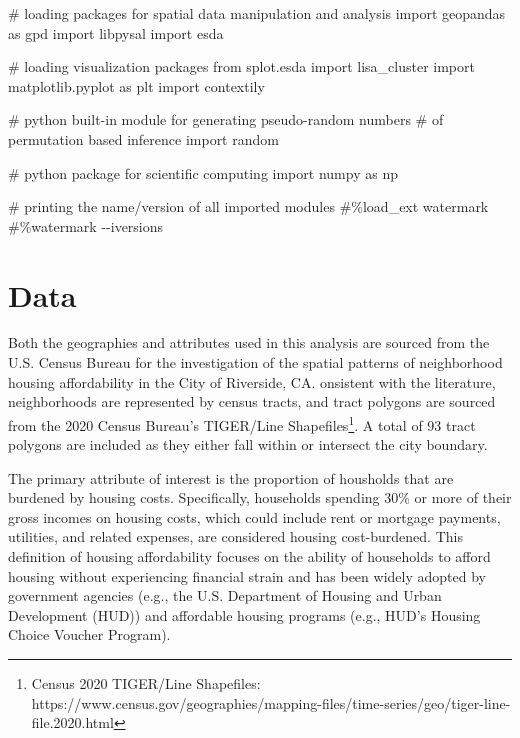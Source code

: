 \documentclass[
]{aft}
\newenvironment{Shaded}{\begin{snugshade}}{\end{snugshade}}
\newcommand{\CommentTok}[1]{\textcolor[rgb]{0.37,0.37,0.37}{#1}}
\newcommand{\ImportTok}[1]{\textcolor[rgb]{0.00,0.46,0.62}{#1}}
\newcommand{\NormalTok}[1]{\textcolor[rgb]{0.00,0.23,0.31}{#1}}
\begin{document}
\begin{Shaded}
\begin{Highlighting}[]
\CommentTok{\# loading packages for spatial data manipulation and analysis }
\ImportTok{import}\NormalTok{ geopandas }\ImportTok{as}\NormalTok{ gpd}
\ImportTok{import}\NormalTok{ libpysal}
\ImportTok{import}\NormalTok{ esda}

\CommentTok{\# loading visualization packages}
\ImportTok{from}\NormalTok{ splot.esda }\ImportTok{import}\NormalTok{ lisa\_cluster}
\ImportTok{import}\NormalTok{ matplotlib.pyplot }\ImportTok{as}\NormalTok{ plt}
\ImportTok{import}\NormalTok{ contextily}

\CommentTok{\# python built{-}in module for generating pseudo{-}random numbers }
\CommentTok{\# of permutation based inference}
\ImportTok{import}\NormalTok{ random}

\CommentTok{\# python package for scientific computing }
\ImportTok{import}\NormalTok{ numpy }\ImportTok{as}\NormalTok{ np}

\CommentTok{\# printing the name/version of all imported modules}
\CommentTok{\#\%load\_ext watermark}
\CommentTok{\#\%watermark {-}{-}iversions }
\end{Highlighting}
\end{Shaded}

\section{Data}\label{sec-data}

Both the geographies and attributes used in this analysis are sourced
from the U.S. Census Bureau for the investigation of the spatial
patterns of neighborhood housing affordability in the City of Riverside,
CA. onsistent with the literature, neighborhoods are represented by
census tracts, and tract polygons are sourced from the 2020 Census
Bureau's TIGER/Line Shapefiles\footnote{Census 2020 TIGER/Line
  Shapefiles:
  https://www.census.gov/geographies/mapping-files/time-series/geo/tiger-line-file.2020.html}.
A total of 93 tract polygons are included as they either fall within or
intersect the city boundary.

The primary attribute of interest is the proportion of housholds that
are burdened by housing costs. Specifically, households spending 30\% or
more of their gross incomes on housing costs, which could include rent
or mortgage payments, utilities, and related expenses, are considered
housing cost-burdened. This definition of housing affordability focuses
on the ability of households to afford housing without experiencing
financial strain and has been widely adopted by government agencies
(e.g., the U.S. Department of Housing and Urban Development (HUD)) and
affordable housing programs (e.g., HUD's Housing Choice Voucher
Program).
\end{document}
